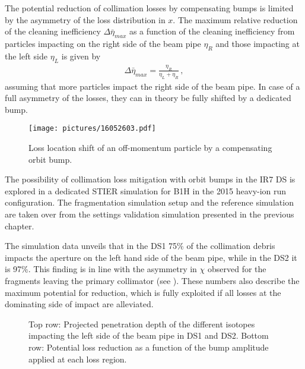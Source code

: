The potential reduction of collimation losses by compensating bumps is limited by the asymmetry of the loss distribution in $x$. The maximum  relative reduction of the cleaning inefficiency $\Delta \bar{\eta}_{max}$ as a function of the cleaning inefficiency from particles impacting on the right side of the beam pipe $\eta_{R}$ and those impacting at the left side $\eta_L$ is given by
\begin{align}
\Delta \bar{\eta}_{max} = \frac{\eta_R}{\eta_L + \eta_R} \, ,
\end{align}
assuming that more particles impact the right side of the beam pipe.  In case of a full asymmetry of the losses, they can in theory be fully shifted by a dedicated bump.

\begin{figure}[t]  
    \centering
    \texttt{[image: pictures/16052603.pdf]}
    \caption{Loss location shift of an off-momentum particle by a compensating orbit bump.}  
    \label{pic:16052602}
\end{figure}


The possibility of collimation loss mitigation with orbit bumps in the IR7 DS is explored in a dedicated STIER simulation for B1H in the 2015 heavy-ion run configuration. The fragmentation simulation setup and the reference simulation are taken over from the settings validation simulation presented in the previous chapter. 

The simulation data unveils that in the DS1 75\% of the collimation debris impacts the aperture on the left hand side of the beam pipe, while in the DS2 it is 97\%. This finding is in line with the asymmetry in $\chi$ observed for the fragments leaving the primary collimator (see ). These numbers also describe the maximum potential for reduction, which is fully exploited if all losses at the dominating side of impact are alleviated.

\begin{figure}[t]
  \centering
  \caption{Top row: Projected penetration depth of the different isotopes impacting the left side of the beam pipe in DS1 and DS2. Bottom row: Potential loss reduction as a function of the bump amplitude applied at each loss region. }  
  \label{pic:16061701}
  \end{figure}



